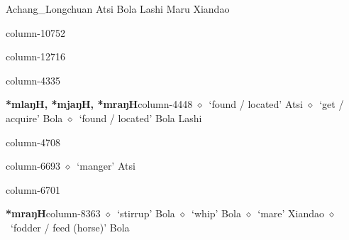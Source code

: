 \hspace{1ex}
         Achang\_Longchuan 
\hspace{1ex}
         Atsi 
\hspace{1ex}
         Bola 
\hspace{1ex}
         Lashi 
\hspace{1ex}
         Maru 
\hspace{1ex}
         Xiandao 
  \item {\footnotesize \textbf{}}{\tiny column-10752}
  \item {\footnotesize \textbf{}}{\tiny column-12716}
  \item {\footnotesize \textbf{}}{\tiny column-4335}
  \item {\footnotesize \textbf{*mlaŋH, *mjaŋH, *mraŋH}}{\tiny column-4448}
         $\diamond$~`found / located'
         Atsi 
\hspace{1ex}
         $\diamond$~`get / acquire'
         Bola 
\hspace{1ex}
         $\diamond$~`found / located'
         Bola 
\hspace{1ex}
         Lashi 
  \item {\footnotesize \textbf{}}{\tiny column-4708}
  \item {\footnotesize \textbf{}}{\tiny column-6693}
         $\diamond$~`manger'
         Atsi 
  \item {\footnotesize \textbf{}}{\tiny column-6701}
  \item {\footnotesize \textbf{*mraŋH}}{\tiny column-8363}
         $\diamond$~`stirrup'
         Bola 
\hspace{1ex}
         $\diamond$~`whip'
         Bola 
\hspace{1ex}
         $\diamond$~`mare'
         Xiandao 
\hspace{1ex}
         $\diamond$~`fodder / feed (horse)'
         Bola 
\hspace{1ex}
